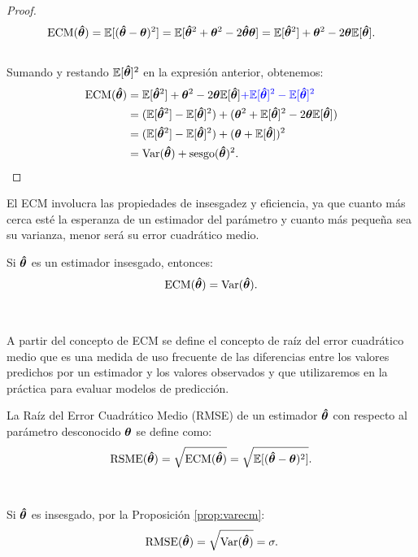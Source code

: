 \documentclass[oneside,openright,titlepage,numbers=noenddot,openany,headinclude,footinclude=true,
cleardoublepage=empty,abstractoff,BCOR=5mm,paper=a4,fontsize=12pt,main=spanish]{scrreprt}
\begin{document}
\begin{proof}
 $$\text{ECM}(\bm{\hat{\theta}})=\mathbb{E}[(\bm{\hat{\theta}}-\bm{\theta})^2]=\mathbb{E}[\bm{\hat{\theta}}^2+\bm{\theta}^2-2\bm{\hat{\theta}} \bm{\theta}]=\mathbb{E}[\bm{\hat{\theta}}^2]+\bm{\theta}^2-2\bm{\theta}\mathbb{E}[\bm{\hat{\theta}}].$$\\
Sumando y restando $\mathbb{E}[\bm{\hat{\theta}}]^2$ en la expresión anterior, obtenemos:\\
  \begin{equation*}
  \begin{split}
 \text{ECM}(\bm{\hat{\theta}})&=\mathbb{E}[\bm{\hat{\theta}}^2]+\bm{\theta}^2-2\bm{\theta}\mathbb{E}[\bm{\hat{\theta}}]\textcolor{blue}{+\mathbb{E}[\bm{\hat{\theta}}]^2-\mathbb{E}[\bm{\hat{\theta}}]^2}\\
 &=(\mathbb{E}[\bm{\hat{\theta}}^2]-\mathbb{E}[\bm{\hat{\theta}}]^2)+(\bm{\theta}^2+\mathbb{E}[\bm{\hat{\theta}}]^2-2\bm{\theta}\mathbb{E}[\bm{\hat{\theta}}])\\
 &=(\mathbb{E}[\bm{\hat{\theta}}^2]-\mathbb{E}[\bm{\hat{\theta}}]^2)+(\bm{\theta}+\mathbb{E}[\bm{\hat{\theta}}])^2\\
 &=\text{Var}(\bm{\hat{\theta}})+\text{sesgo}(\bm{\hat{\theta}})^2.
  \end{split}
  \end{equation*} 
\end{proof}

El ECM involucra las propiedades de insesgadez y
eficiencia, ya que cuanto más cerca esté la esperanza de un estimador del parámetro y cuanto más pequeña sea su varianza, menor será su error cuadrático medio.\\

\begin{proposition} \label{prop:varecm}
Si $\bm{\hat{\theta}}$ es un estimador insesgado, entonces: $$\text{ECM}(\bm{\hat{\theta}})=\text{Var}(\bm{\hat{\theta}}).$$ 
\end{proposition}\

A partir del concepto de ECM se define el concepto de raíz del error cuadrático medio que es una medida de uso frecuente de las diferencias entre los valores predichos por un estimador y los valores observados y que utilizaremos en la práctica para evaluar modelos de predicción.\\

\begin{definition}
La Raíz del Error Cuadrático Medio (RMSE) de un estimador $\bm{\hat{\theta}}$ con respecto al parámetro desconocido $\bm{\theta}$ se define como: $$\text{RSME}(\bm{\hat{\theta}})=\sqrt{\text{ECM}(\bm{\hat{\theta}})}=\sqrt{\mathbb{E}[(\bm{\hat{\theta}}-\bm{\theta})^2]}.$$
\end{definition}\

\begin{remark}
Si $\bm{\hat{\theta}}$ es insesgado, por la Proposición \ref{prop:varecm}: $$\text{RMSE}(\bm{\hat{\theta}})=\sqrt{\text{Var}(\bm{\hat{\theta}})}=\sigma.$$
\end{remark}
\end{document}
